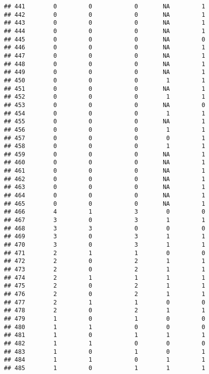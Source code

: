 \documentclass[
]{article}
\begin{document}
\begin{verbatim}
## 441        0         0            0       NA         1
## 442        0         0            0       NA         1
## 443        0         0            0       NA         1
## 444        0         0            0       NA         1
## 445        0         0            0       NA         0
## 446        0         0            0       NA         1
## 447        0         0            0       NA         1
## 448        0         0            0       NA         1
## 449        0         0            0       NA         1
## 450        0         0            0        1         1
## 451        0         0            0       NA         1
## 452        0         0            0        1         1
## 453        0         0            0       NA         0
## 454        0         0            0        1         1
## 455        0         0            0       NA         1
## 456        0         0            0        1         1
## 457        0         0            0        0         1
## 458        0         0            0        1         1
## 459        0         0            0       NA         1
## 460        0         0            0       NA         1
## 461        0         0            0       NA         1
## 462        0         0            0       NA         1
## 463        0         0            0       NA         1
## 464        0         0            0       NA         1
## 465        0         0            0       NA         1
## 466        4         1            3        0         0
## 467        3         0            3        1         1
## 468        3         3            0        0         0
## 469        3         0            3        1         1
## 470        3         0            3        1         1
## 471        2         1            1        0         0
## 472        2         0            2        1         1
## 473        2         0            2        1         1
## 474        2         1            1        1         1
## 475        2         0            2        1         1
## 476        2         0            2        1         1
## 477        2         1            1        0         0
## 478        2         0            2        1         1
## 479        1         0            1        0         0
## 480        1         1            0        0         0
## 481        1         0            1        1         1
## 482        1         1            0        0         0
## 483        1         0            1        0         1
## 484        1         1            0        1         1
## 485        1         0            1        1         1

\end{verbatim}
\end{document}
